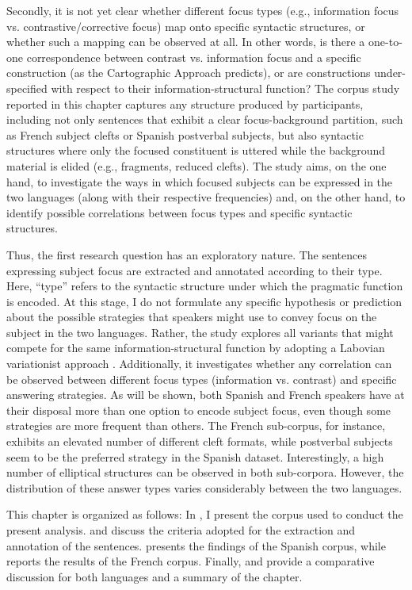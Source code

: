 Secondly, it is not yet clear whether different focus types (e.g., information focus vs. contrastive/corrective focus) map onto specific syntactic structures, or whether such a mapping can be observed at all. In other words, is there a one-to-one correspondence between contrast vs. information focus and a specific construction (as the Cartographic Approach \textcite{rizzi1997fine} predicts), or are constructions under-specified with respect to their information-structural function? 
The corpus study reported in this chapter captures any structure produced by participants, including not only sentences that exhibit a clear focus-background partition, such as French subject clefts or Spanish postverbal subjects, but also syntactic structures where only the focused constituent is uttered while the background material is elided (e.g., fragments, reduced clefts). The study aims, on the one hand, to investigate the ways in which focused subjects can be expressed in the two languages (along with their respective frequencies) and, on the other hand, to identify possible correlations between focus types and specific syntactic structures.

Thus, the first research question has an exploratory nature. The sentences expressing subject focus are extracted and annotated according to their type. Here, ``type” refers to the syntactic structure under which the pragmatic function is encoded. At this stage, I do not formulate any specific hypothesis or prediction about the possible strategies that speakers might use to convey focus on the subject in the two languages. Rather, the study explores all variants that might compete for the same information-structural function by adopting a Labovian variationist approach \parencite{labov1972sociolinguistic}. Additionally, it investigates whether any correlation can be observed between different focus types (information vs. contrast) and specific answering strategies. As will be shown, both Spanish and French speakers have at their disposal more than one option to encode subject focus, even though some strategies are more frequent than others. The French sub-corpus, for instance, exhibits an elevated number of different cleft formats, while postverbal subjects seem to be the preferred strategy in the Spanish dataset. Interestingly, a high number of elliptical structures can be observed in both sub-corpora. However, the distribution of these answer types varies considerably between the two languages.

This chapter is organized as follows: In , I present the corpus used to conduct the present analysis.  and  discuss the criteria adopted for the extraction and annotation of the sentences.  presents the findings of the Spanish corpus, while  reports the results of the French corpus. Finally,  and  provide a comparative discussion for both languages and a summary of the chapter. 


